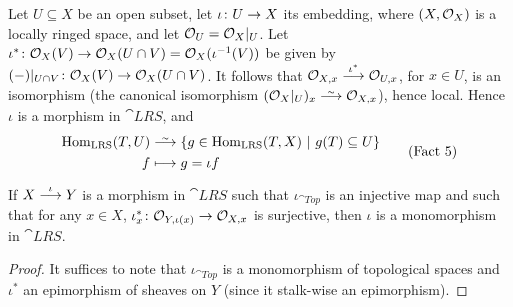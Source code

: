 \documentclass[a4paper,parskip=half,numbers=enddot, DIV=12]{scrreprt}
\begin{document}
\begin{example}
    Let $U\subseteq X$ be an open subset, let $\iota\colon U\morphism X$ its embedding, where $(X,\mathcal{O}_X)$ is a locally ringed space, and let $\mathcal{O}_U = \mathcal{O}_X|_U$. Let $\iota^*\colon \Oo_X(V)\morphism \Oo_X(U\cap V) = \Oo_X(\iota^{-1}(V))$ be given by $(-)|_{U\cap V}\colon \Oo_X(V) \morphism \Oo_X(U\cap V)$. It follows that $\Oo_{X,x}\morphism[\iota^*]\Oo_{U,x}$, for $x\in U$, is an isomorphism (the canonical isomorphism $(\Oo_X|_U)_x \isomorphism \Oo_{X,x}$), hence local. Hence $\iota$ is a morphism in $\cat{LRS}$, and
    \begin{align}\lbl{eq:fact5}
	    \begin{split}
		    \Hom_{\cat{LRS}}(T,U)  &\isomorphism\left\{g\in \Hom_{\cat{LRS}} (T,X) \st g(T)\subseteq U\right\}\\
		    f&\longmapsto g=\iota f
	    \end{split}\tag{Fact 5}
    \end{align}
\end{example}
\begin{fact}
    If $X\morphism[\iota] Y$ is a morphism in $\cat{LRS}$ such that $\iota_{\cat{Top}}$ is an injective map and such that for any $x\in X$, $\iota_x^*\colon \Oo_{Y,\iota(x)} \morphism \Oo_{X,x}$ is surjective, then $\iota$ is a monomorphism in $\cat{LRS}$.
\end{fact}
\begin{proof}
	It suffices to note that $\iota_{\cat{Top}}$ is a monomorphism of topological spaces and $\iota^*$ an epimorphism of sheaves on $Y$ (since it stalk-wise an epimorphism).
\end{proof}
\end{document}
